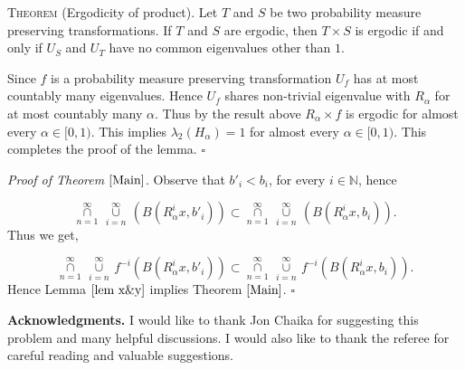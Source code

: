 \documentclass[11pt, english, reqno]{amsart}
\theoremstyle{definition}
\theoremstyle{remark}
\numberwithin{equation}{section}
\numberwithin{equation}{section}
\newcommand{\LS}{\ensuremath{\underset{n=1}{\overset{\infty}{\cap}} \, {\underset{i=n}{\overset{\infty}{\cup}}}\,}}
\begin{document}
\noindent \textsc{Theorem} (Ergodicity of product). Let $T$ and $S$ be two probability measure preserving transformations. If $T$ and $S$ are ergodic, then $T \times S$ is ergodic if and only if $U_S$ and $U_T$ have no common eigenvalues other than $1$.

\vspace{2mm}

Since $f$ is a probability measure preserving transformation $U_f$ has at most countably many eigenvalues. Hence $U_f$ shares non-trivial eigenvalue with $R_{\alpha}$ for at most countably many $\alpha$. Thus by the result above $R_{\alpha} \times f$ is ergodic for almost every $\alpha \in [0,1)$. This implies $\lambda_2 (H_{\alpha}) = 1$ for almost every $\alpha \in [0,1)$. This completes the proof of the lemma.  \hfill{$\square$} 

\vspace{3mm}

\noindent\textit{Proof of Theorem $\ref{Main}$}. Observe that $b'_i < b_i$, for every $i \in \mathbb{N}$, hence

$$
\LS (B (R_{\alpha}^{i} x,b'_i)) \subset \LS (B (R_{\alpha}^{i} x,b_i)).
$$ Thus we get,

$$
\LS f^{-i}(B (R_{\alpha}^{i} x,b'_i)) \subset \LS f^{-i}(B (R_{\alpha}^{i} x,b_i)).
$$ Hence Lemma $\ref{lem x&y}$ implies Theorem $\ref{Main}$. \hfill{$\square$} 

\vspace{3mm}

\textbf{Acknowledgments.} I would like to thank Jon Chaika for suggesting this problem and many helpful discussions. I would also like to thank the referee for careful reading and valuable suggestions.



\end{document}
